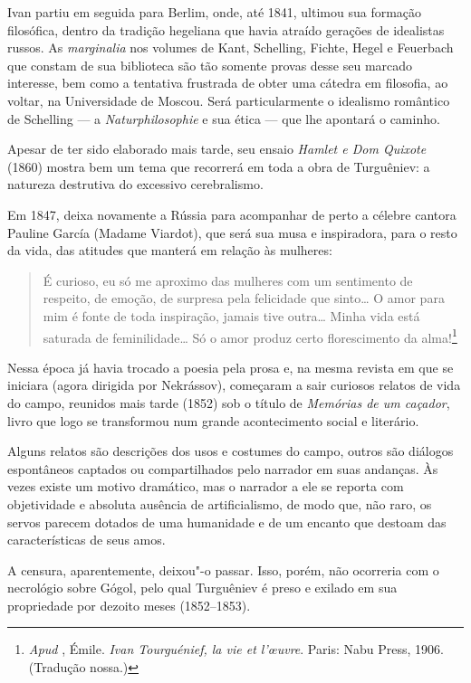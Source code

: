 Ivan partiu em seguida para Berlim, onde, até 1841, ultimou sua formação
filosófica, dentro da tradição hegeliana que havia atraído gerações de
idealistas russos. As \emph{marginalia} nos volumes de Kant, Schelling,
Fichte, Hegel e Feuerbach que constam de sua biblioteca são tão somente
provas desse seu marcado interesse, bem como a tentativa frustrada
de obter uma cátedra em filosofia, ao voltar, na Universidade de
Moscou. Será particularmente o idealismo romântico de Schelling --- a
\emph{Naturphilosophie} e sua ética --- que lhe apontará o caminho.

Apesar de ter sido elaborado mais tarde, seu ensaio \emph{Hamlet e Dom
Quixote} (1860) mostra bem um tema que recorrerá em toda a  obra
de Turguêniev: a natureza destrutiva do excessivo cerebralismo.

Em 1847, deixa novamente a Rússia para acompanhar de perto a célebre
cantora Pauline García (Madame Viardot), que será sua musa e inspiradora, para o
resto da vida, das atitudes que manterá em relação às mulheres:

\begin{quotation}
É curioso, eu só me aproximo das mulheres com um sentimento de
respeito, de emoção, de surpresa pela felicidade que sinto\ldots{} O amor para
mim é fonte de toda inspiração, jamais tive outra\ldots{} Minha vida está
saturada de feminilidade\ldots{} Só o amor produz certo florescimento da
alma!\footnote{\emph{Apud} , Émile. \emph{Ivan Tourguénief, la vie et l'œuvre}.
Paris: Nabu Press, 1906. (Tradução nossa.)}
\end{quotation}

Nessa época já havia trocado a poesia pela prosa e, na mesma revista
em que se iniciara (agora dirigida por Nekrássov), começaram a sair curiosos relatos de vida do
campo, reunidos mais tarde (1852) sob o título de \emph{Memórias
de um caçador}, livro que logo se transformou num grande acontecimento social
e literário.

Alguns relatos são descrições dos usos e costumes do campo, outros são diálogos
espontâneos captados ou compartilhados pelo narrador em suas andanças.
Às vezes existe um motivo dramático, mas o narrador a ele se
reporta com objetividade e absoluta ausência de artificialismo, de modo
que, não raro, os servos parecem dotados de uma humanidade e de um encanto
que destoam das características de seus amos.

A censura, aparentemente, deixou"-o passar. Isso, porém, não ocorreria com o necrológio
sobre Gógol, pelo qual Turguêniev é preso e exilado em sua propriedade
por dezoito meses (1852--1853).

